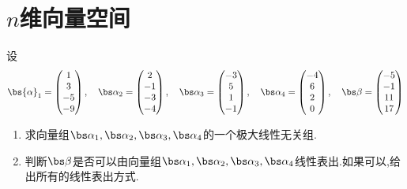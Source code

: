 \documentclass{ctexart}
\begin{document}
\section{$n$维向量空间}
\begin{problem}
    设
    \[\bs{\alpha}_1=\begin{pmatrix}
        1\\3\\-5\\-9
    \end{pmatrix},\quad\bs\alpha_2=\begin{pmatrix}
        2\\-1\\-3\\-4
    \end{pmatrix},\quad\bs\alpha_3=\begin{pmatrix}
        -3\\5\\1\\-1
    \end{pmatrix},\quad\bs\alpha_4=\begin{pmatrix}
        -4\\6\\2\\0
    \end{pmatrix},\quad\bs\beta=\begin{pmatrix}
        -5\\-1\\11\\17
    \end{pmatrix}\]
    \begin{enumerate}[label=\tbf{\arabic*}.,topsep=0pt,parsep=0pt,itemsep=0pt,partopsep=0pt]
        \item 求向量组$\bs\alpha_1,\bs\alpha_2,\bs\alpha_3,\bs\alpha_4$的一个极大线性无关组.
        \item 判断$\bs\beta$是否可以由向量组$\bs\alpha_1,\bs\alpha_2,\bs\alpha_3,\bs\alpha_4$线性表出.如果可以,给出所有的线性表出方式.
    \end{enumerate}
\end{problem}
\end{document}
